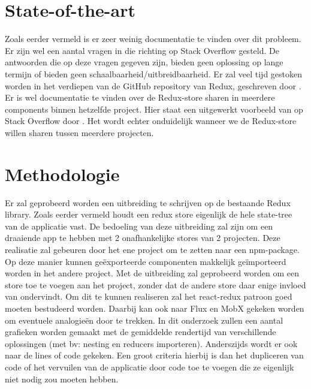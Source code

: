 \section{State-of-the-art}
\label{sec:state-of-the-art}

Zoals eerder vermeld is er zeer weinig documentatie te vinden over dit probleem. Er zijn wel een aantal vragen in die richting op Stack Overflow gesteld. De antwoorden die op deze vragen gegeven zijn, bieden geen oplossing op lange termijn of bieden geen schaalbaarheid/uitbreidbaarheid. Er zal veel tijd gestoken worden in het verdiepen van de GitHub repository van Redux, geschreven door \textcite{Redux01}. Er is wel documentatie te vinden over de Redux-store sharen in meerdere components binnen hetzelfde project. Hier staat een uitgewerkt voorbeeld van op Stack Overflow door \textcite{2017}. Het wordt echter onduidelijk wanneer we de Redux-store willen sharen tussen meerdere projecten.   




\section{Methodologie}
\label{sec:methodologie}
Er zal geprobeerd worden een uitbreiding te schrijven op de bestaande Redux library. Zoals eerder vermeld houdt een redux store eigenlijk de hele state-tree van de applicatie vast. De bedoeling van deze uitbreiding zal zijn om een draaiende app te hebben met 2 onafhankelijke stores van 2 projecten. Deze realisatie zal gebeuren door het ene project om te zetten naar een npm-package. Op deze manier kunnen geëxporteerde componenten makkelijk geïmporteerd worden in het andere project. Met de uitbreiding zal geprobeerd worden om een store toe te voegen aan het project, zonder dat de andere store daar enige invloed van ondervindt. Om dit te kunnen realiseren zal het react-redux patroon goed moeten bestudeerd worden. Daarbij kan ook naar Flux en MobX gekeken worden om eventuele analogieën door te trekken. In dit onderzoek zullen een aantal grafieken worden gemaakt met de gemiddelde rendertijd van verschillende oplossingen (met bv: nesting en reducers importeren). Anderszijds wordt er ook naar de lines of code gekeken. Een groot criteria hierbij is dan het dupliceren van code of het vervuilen van de applicatie door code toe te voegen die ze eigenlijk niet nodig zou moeten hebben. 



